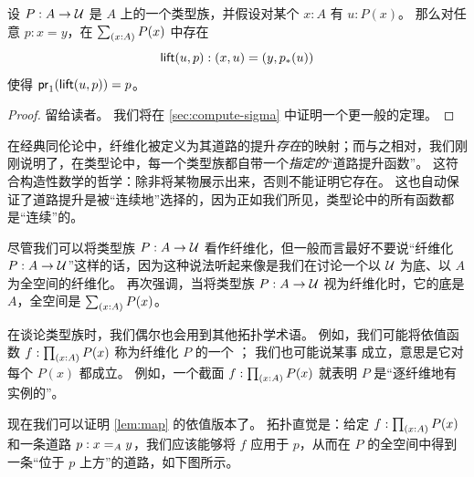 \begin{lem}[道路提升性质]\label{thm:path-lifting}
  设 $P:A\to\type$ 是 $A$ 上的一个类型族，并假设对某个 $x:A$ 有 $u:P(x)$。
  那么对任意 $p:x=y$，在 $\sm{x:A}P(x)$ 中存在
  \begin{equation*}
    \mathsf{lift}(u,p):(x,u)=(y,\trans{p}{u})
  \end{equation*}
  使得 $\ap{\proj1}{\mathsf{lift}(u,p)} = p$。
\end{lem}

\begin{proof}
  留给读者。
  我们将在 \cref{sec:compute-sigma} 中证明一个更一般的定理。
\end{proof}

在经典同伦论中，纤维化被定义为其道路的提升\emph{存在}的映射；而与之相对，我们刚刚说明了，在类型论中，每一个类型族都自带一个\emph{指定的}``道路提升函数''。
这符合构造性数学的哲学：除非将某物展示出来，否则不能证明它存在。
%
这也自动保证了道路提升是被``连续地''选择的，因为正如我们所见，类型论中的所有函数都是``连续''的。

\begin{rmk}
  尽管我们可以将类型族 $P:A\to \type$ 看作纤维化，但一般而言最好不要说``纤维化 $P:A\to\type$''这样的话，因为这种说法听起来像是我们在讨论一个以 $\type$ 为底、以 $A$ 为全空间的纤维化。
  再次强调，当将类型族 $P:A\to \type$ 视为纤维化时，它的底是 $A$，全空间是 $\sm{x:A} P(x)$。

  在谈论类型族时，我们偶尔也会用到其他拓扑学术语。
  例如，我们可能将依值函数 $f:\prd{x:A} P(x)$ 称为纤维化 $P$ 的一个
  ；%
  我们也可能说某事
  成立，意思是它对每个 $P(x)$ 都成立。
  例如，一个截面 $f:\prd{x:A} P(x)$ 就表明 $P$ 是``逐纤维地有实例的''。
\end{rmk}

现在我们可以证明 \cref{lem:map} 的依值版本了。
拓扑直觉是：给定 $f:\prd{x:A} P(x)$ 和一条道路 $p:\id[A]xy$，我们应该能够将 $f$ 应用于 $p$，从而在 $P$ 的全空间中得到一条``位于 $p$ 上方''的道路，如下图所示。

\begin{center}
\end{center}

